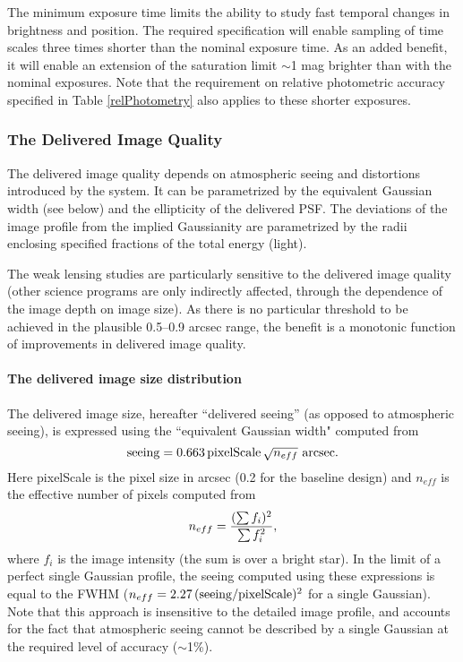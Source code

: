 The minimum exposure time limits the ability to study fast temporal
changes in brightness and position. The required specification will
enable sampling of time scales three times shorter than the nominal
exposure time. As an added benefit, it will enable an extension of the
saturation limit $\sim$1 mag brighter than with the nominal exposures.
Note that the requirement on relative photometric accuracy specified in
Table \ref{relPhotometry} also applies to these shorter exposures.

\subsubsection{        The Delivered Image Quality       }

The delivered image quality depends on atmospheric seeing and distortions
introduced by the system. It can be parametrized by the equivalent Gaussian
width (see below) and the ellipticity of the delivered PSF.  The deviations
of the image profile from the implied Gaussianity are parametrized by the
radii enclosing specified fractions of the total energy (light).

The weak lensing studies are particularly sensitive to the delivered image
quality (other science programs are only indirectly affected, \eg
through the dependence of the image depth on image size). As there is no
particular threshold to be achieved in the plausible 0.5--0.9 arcsec range,
the benefit is a monotonic function of improvements in delivered image
quality.


\paragraph{The delivered image size distribution\\}


The delivered image size, hereafter ``delivered seeing'' (as opposed to
atmospheric seeing), is expressed using the ``equivalent Gaussian width"
computed from
\begin{equation}
      {\rm seeing} = 0.663 \, {\rm pixelScale} \, \sqrt{n_{eff}} \,\,{\rm arcsec}.
\end{equation}
Here pixelScale is the pixel size in arcsec (0.2 for the baseline
design) and $n_{eff}$ is the effective number of pixels computed from
\begin{equation}
        n_{eff}  = {(\sum f_i)^2 \over \sum f_i^2},
\end{equation}
where $f_i$ is the image intensity (\ie the sum is over a bright
star).  In the limit of a perfect single Gaussian profile, the seeing computed
using these expressions is equal to the FWHM
($n_{eff}=2.27\,({\rm seeing/pixelScale})^2$ for a single Gaussian). Note that
this approach is insensitive to the detailed image profile, and accounts
for the fact that atmospheric seeing cannot be described by a single
Gaussian at the required level of accuracy ($\sim$1\%).

